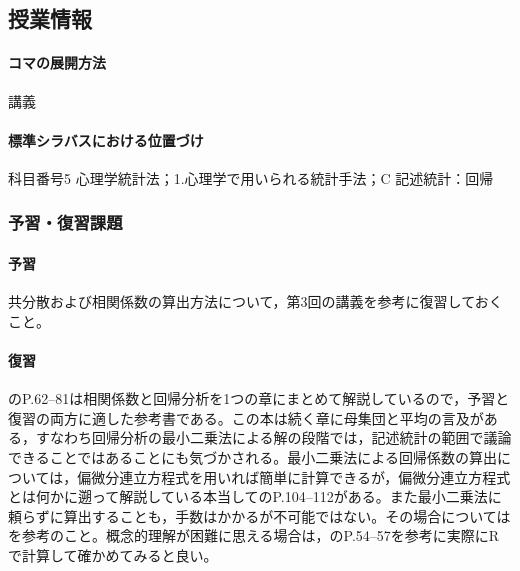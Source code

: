 \subsection{授業情報}
\paragraph{コマの展開方法}
講義
\paragraph{標準シラバスにおける位置づけ}
科目番号5 心理学統計法；1.心理学で用いられる統計手法；C 記述統計：回帰
\subsubsection{予習・復習課題}
\paragraph{予習}
共分散および相関係数の算出方法について，第3回の講義を参考に復習しておくこと。
\paragraph{復習}
\citet{山内201001}のP.62--81は相関係数と回帰分析を1つの章にまとめて解説しているので，予習と復習の両方に適した参考書である。この本は続く章に母集団と平均の言及がある，すなわち回帰分析の最小二乗法による解の段階では，記述統計の範囲で議論できることではあることにも気づかされる。最小二乗法による回帰係数の算出については，偏微分連立方程式を用いれば簡単に計算できるが，偏微分連立方程式とは何かに遡って解説している本当して\citet{kosugi2018}のP.104--112がある。また最小二乗法に頼らずに算出することも，手数はかかるが不可能ではない。その場合については\citet{西内201712}を参考のこと。概念的理解が困難に思える場合は，\citet{kosugi2018}のP.54--57を参考に実際にRで計算して確かめてみると良い。
